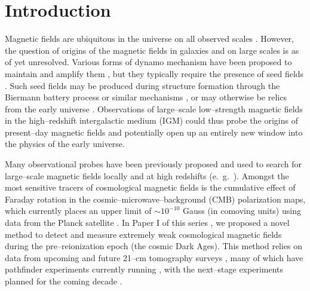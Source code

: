 \section{Introduction}
\label{sec:intro}

Magnetic fields are ubiquitous in the universe on all observed scales \cite{2013A&ARv..21...62D,Vallee04,Neronov10,2005LNP...664...89W,2012SSRv..166..215B}. However, the question of origins of the magnetic fields in galaxies and on large scales is as of yet unresolved. Various forms of dynamo mechanism have been proposed to maintain and amplify them \cite{2013PhRvE..87e3110P}, but they typically require the presence of seed fields \cite{2013A&ARv..21...62D}. Such seed fields may be produced during structure formation through the Biermann battery process or similar mechanisms \cite{Naoz13,2013PhRvL.111e1303N}, or may otherwise be relics from the early universe \cite{2013A&ARv..21...62D,2012SSRv..166...37W,2014JCAP...05..040K}. Observations of large--scale low--strength magnetic fields in the high--redshift intergalactic medium (IGM) could thus probe the origins of present--day magnetic fields and potentially open up an entirely new window into the physics of the early universe.

Many observational probes have been previously proposed and used to search for large--scale magnetic fields locally and at high redshifts (e.~g.~\cite{Yamazaki10,Blasi99,Tavecchio10,Dolag11,2005LNP...664...89W,2014JCAP...01..009K,2013ApJ...770...47K,2014PhRvD..89j3522S,2006MNRAS.372.1060T,2009ApJ...692..236S}). Amongst the most sensitive tracers of cosmological magnetic fields is the cumulative effect of Faraday rotation in the cosmic--microwave--background (CMB) polarization maps, which currently places an upper limit of $\sim$$10^{-10}$ Gauss (in comoving units) using data from the Planck satellite \cite{2015arXiv150201594P}. In Paper I of this series \cite{2014arXiv1410.2250V}, we proposed a novel method to detect and measure extremely weak cosmological magnetic fields during the pre--reionization epoch (the cosmic Dark Ages). This method relies on data from upcoming and future 21--cm tomography surveys \cite{1997ApJ...475..429M,2004PhRvL..92u1301L}, many of which have pathfinder experiments currently running \cite{2012arXiv1201.1700G,2011AAS...21813206B,2014ApJ...788..106P,2008arXiv0802.1727C,Vanderlinde14,2015AAS...22532803D}, with the next--stage experiments planned for the coming decade \cite{2008arXiv0802.1727C,2015AAS...22532803D}. 

